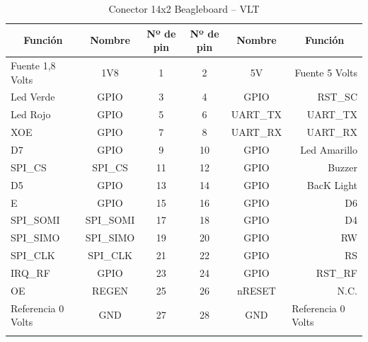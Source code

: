 \begin{longtable}{|l|c|c|c|c|r|}
\hline
\multicolumn{1}{|c|}{\textbf{Función}} & \textbf{Nombre} & \textbf{Nº de pin} & \textbf{Nº de pin} & \textbf{Nombre} & \multicolumn{1}{c|}{\textbf{Función}} \\ \hline
Fuente 1,8 Volts & 1V8 & 1 & 2 & 5V & Fuente 5 Volts \\ \hline
Led Verde & GPIO & 3 & 4 & GPIO & RST\_SC \\ \hline
Led Rojo & GPIO & 5 & 6 & UART\_TX & UART\_TX \\ \hline
XOE & GPIO & 7 & 8 & UART\_RX & UART\_RX \\ \hline
D7 & GPIO & 9 & 10 & GPIO & Led Amarillo \\ \hline
SPI\_CS & SPI\_CS & 11 & 12 & GPIO & Buzzer \\ \hline
D5 & GPIO & 13 & 14 & GPIO & BacK Light \\ \hline
E & GPIO & 15 & 16 & GPIO & D6 \\ \hline
SPI\_SOMI & SPI\_SOMI & 17 & 18 & GPIO & D4 \\ \hline
SPI\_SIMO & SPI\_SIMO & 19 & 20 & GPIO & RW \\ \hline
SPI\_CLK & SPI\_CLK & 21 & 22 & GPIO & RS \\ \hline
IRQ\_RF & GPIO & 23 & 24 & GPIO & RST\_RF \\ \hline
OE & REGEN & 25 & 26 & nRESET & N.C. \\ \hline
Referencia 0 Volts & GND & 27 & 28 & GND & \multicolumn{1}{l|}{Referencia 0 Volts} \\ \hline
\caption{Conector 14x2 Beagleboard – VLT}
\label{}
\end{longtable}


